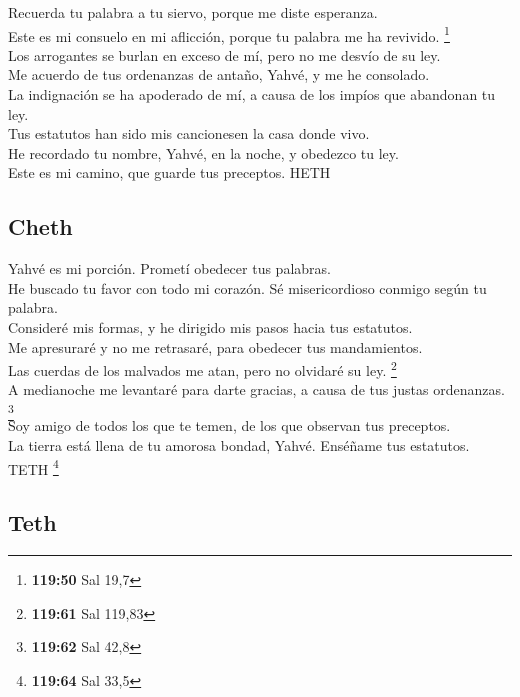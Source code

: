  Recuerda tu palabra a tu siervo, porque me diste
esperanza.\\
 Este es mi consuelo en mi aflicción, porque tu palabra
me ha revivido. \footnote{\textbf{119:50} Sal 19,7}\\
 Los arrogantes se burlan en exceso de mí, pero no me
desvío de su ley.\\
 Me acuerdo de tus ordenanzas de antaño, Yahvé, y me he
consolado.\\
 La indignación se ha apoderado de mí, a causa de los
impíos que abandonan tu ley.\\
 Tus estatutos han sido mis cancionesen la casa donde
vivo.\\
 He recordado tu nombre, Yahvé, en la noche, y obedezco
tu ley.\\
 Este es mi camino, que guarde tus preceptos. HETH

\hypertarget{cheth}{%
\subsection{Cheth}\label{cheth}}

 Yahvé es mi porción. Prometí obedecer tus palabras.\\
 He buscado tu favor con todo mi corazón. Sé
misericordioso conmigo según tu palabra.\\
 Consideré mis formas, y he dirigido mis pasos hacia tus
estatutos.\\
 Me apresuraré y no me retrasaré, para obedecer tus
mandamientos.\\
 Las cuerdas de los malvados me atan, pero no olvidaré su
ley. \footnote{\textbf{119:61} Sal 119,83}\\
 A medianoche me levantaré para darte gracias, a causa de
tus justas ordenanzas. \footnote{\textbf{119:62} Sal 42,8}\\
 Soy amigo de todos los que te temen, de los que observan
tus preceptos.\\
 La tierra está llena de tu amorosa bondad, Yahvé.
Enséñame tus estatutos. TETH \footnote{\textbf{119:64} Sal 33,5}

\hypertarget{teth}{%
\subsection{Teth}\label{teth}}

